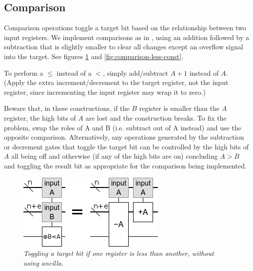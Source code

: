 \documentclass[twocolumn]{article}
\begin{document}
\subsection{Comparison}

Comparison operations toggle a target bit based on the relationship between two input registers.
We implement comparisons as in \cite{takahashi2005}, using an addition followed by a subtraction that is slightly smaller to clear all changes except an overflow signal into the target.
See figures \ref{fig:comparison-less} and \ref{fig:comparison-less-const}.

To perform a $\leq$ instead of a $<$, simply add/subtract $A+1$ instead of $A$.
(Apply the extra increment/decrement to the target register, not the input register, since incrementing the input register may wrap it to zero.)

Beware that, in these constructions, if the $B$ register is smaller than the $A$ register, the high bits of $A$ are lost and the construction breaks.
To fix the problem, swap the roles of A and B (i.e. subtract out of A instead) and use the opposite comparison.
Alternatively, any operations generated by the subtraction or decrement gates that toggle the target bit can be controlled by the high bits of $A$ all being off and otherwise (if any of the high bits are on) concluding $A>B$ and toggling the result bit as appropriate for the comparison being implemented.

\begin{figure}
  \centering
  \includegraphics[width=\linewidth]{assets/comparison-less.png}
  \caption{\em Toggling a target bit if one register is less than another, without using ancilla.}
  \label{fig:comparison-less}
\end{figure}
\end{document}
